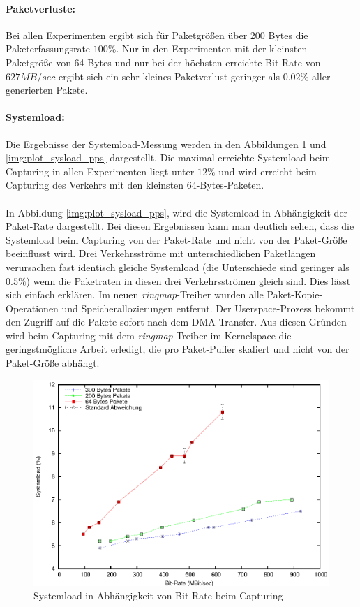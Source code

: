 \paragraph*{Paketverluste:} Bei allen Experimenten ergibt sich für Paketgrößen
über 200 Bytes die Paketerfassungsrate $100\%$. Nur in den Experimenten mit der
kleinsten Paketgröße von 64-Bytes und nur bei der höchsten erreichte Bit-Rate
von $627 MB/sec$ ergibt sich ein sehr kleines Paketverlust geringer als
$0.02\%$ aller generierten Pakete.
%
\paragraph*{Systemload:}
Die Ergebnisse der Systemload-Messung werden in den Abbildungen
\ref{img:plot_sysload_mbs} und \ref{img:plot_sysload_pps} dargestellt. Die
maximal erreichte Systemload beim Capturing in allen Experimenten liegt unter
$12\%$ und wird erreicht beim Capturing des Verkehrs mit den kleinsten
64-Bytes-Paketen.\\\\
%
In Abbildung \ref{img:plot_sysload_pps}, wird die Systemload in Abhängigkeit
der Paket-Rate dargestellt. Bei diesen Ergebnissen kann man deutlich sehen, dass
die Systemload beim Capturing von der Paket-Rate und nicht von der Paket-Größe
beeinflusst wird. Drei Verkehrsströme mit unterschiedlichen Paketlängen
verursachen fast identisch gleiche Systemload (die Unterschiede sind geringer
als $0.5\%$) wenn die Paketraten in diesen drei Verkehrsströmen gleich sind.
Dies lässt sich einfach erklären. Im neuen \emph{ringmap}-Treiber wurden alle
Paket-Kopie-Operationen und Speicherallozierungen entfernt. Der
Userspace-Prozess bekommt den Zugriff auf die Pakete sofort nach dem
DMA-Transfer. Aus diesen Gründen wird beim Capturing mit dem
\emph{ringmap}-Treiber im Kernelspace die geringstmögliche Arbeit erledigt, die
pro Paket-Puffer skaliert und nicht von der Paket-Größe abhängt.
%
\begin{figure} 
\centering \includegraphics[width=5.5in]{plots/graphs/sysload_single_CPU_pcie_mbs}
\caption{Systemload in Abhängigkeit von Bit-Rate beim Capturing}
\label{img:plot_sysload_mbs}
\end{figure}
